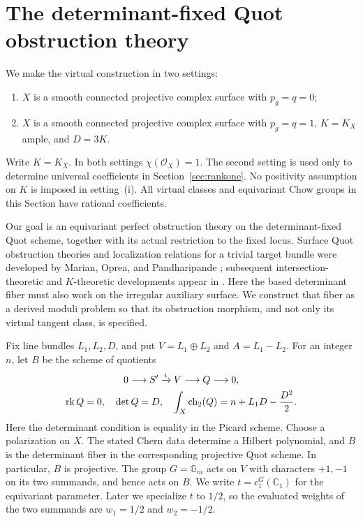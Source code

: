 \section{The determinant-fixed Quot obstruction theory}\label{sec:derived}

We make the virtual construction in two settings:
\begin{enumerate}[label=(\roman*)]
\item $X$ is a smooth connected projective complex surface with $p_g=q=0$;
\item $X$ is a smooth connected projective complex surface with $p_g=q=1$,
      $K=K_X$ ample, and $D=3K$.
\end{enumerate}
Write $K=K_X$.  In both settings $\chi(\mathcal O_X)=1$.
The second setting is used only to determine universal coefficients in
Section~\ref{sec:rankone}.  No positivity assumption on $K$
is imposed in setting~(i).  All virtual classes and equivariant Chow groups
in this Section have rational coefficients.

Our goal is an equivariant perfect obstruction theory on the
determinant-fixed Quot scheme, together with its actual restriction to
the fixed locus.  Surface Quot obstruction theories and localization
relations for a trivial target bundle were developed by
Marian, Oprea, and Pandharipande \cite[Section~1]{MOP}; subsequent
intersection-theoretic and $K$-theoretic developments appear in
\cite{OP,AJLOP}.  Here the based determinant fiber must also work on
the irregular auxiliary surface.  We construct that fiber as a derived
moduli problem so that its obstruction morphism, and not only its
virtual tangent class, is specified.

Fix line bundles $L_1,L_2,D$, and put $V=L_1\oplus L_2$ and $A=L_1-L_2$.
For an integer $n$, let $B$ be the scheme of quotients
\begin{equation}\label{der:quot-sequence}
\begin{gathered}
0\longrightarrow S'\xrightarrow{i}V\longrightarrow Q\longrightarrow0,
\\
\operatorname{rk} Q=0,\quad \det Q=D,\quad
\int_X\operatorname{ch}_2(Q)=n+L_1D-\frac{D^2}{2}.
\end{gathered}
\end{equation}
Here the determinant condition is equality in the Picard scheme.
Choose a polarization on $X$.  The stated Chern data determine a Hilbert
polynomial, and $B$ is the determinant fiber in the corresponding projective
Quot scheme.  In particular, $B$ is projective.  The group
$G=\mathbb G_m$ acts on $V$ with characters $+1,-1$ on its two summands,
and hence acts on $B$.  We write $t=c_1^G(\mathbb C_1)$ for the equivariant
parameter.  Later we specialize $t$ to $1/2$, so the evaluated weights of
the two summands are $w_1=1/2$ and $w_2=-1/2$.

